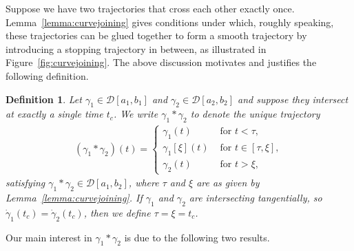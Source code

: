 \documentclass[a4paper]{article}
\theoremstyle{definition}
\theoremstyle{plain}
\newtheorem{define}{Definition\hspace{0.25em}\ignorespaces}
\begin{document}
Suppose we have two trajectories that cross each other exactly once. Lemma~\ref{lemma:curvejoining}
gives conditions under which, roughly speaking, these trajectories can be glued
together to form a smooth trajectory by introducing a stopping trajectory in
between, as illustrated in Figure~\ref{fig:curvejoining}. The above discussion motivates and
justifies the following definition.

\begin{define}
  Let $\gamma_{1} \in \mathcal{D}[a_{1}, b_{1}]$ and
  $\gamma_{2} \in \mathcal{D}[a_{2}, b_{2}]$ and suppose they intersect at
  exactly a single time $t_{c}$. We write $\gamma_{1} * \gamma_{2}$ to denote
  the unique trajectory
  \begin{align}
    (\gamma_{1} * \gamma_{2})(t) =
    \begin{cases}
      \gamma_{1}(t) & \text{ for } t < \tau , \\
      \gamma_{1}[\xi](t) & \text{ for } t \in [\tau, \xi] , \\
      \gamma_{2}(t) & \text{ for } t > \xi ,
    \end{cases}
  \end{align}
  satisfying $\gamma_{1} * \gamma_{2} \in \mathcal{D}[a_{1}, b_{2}]$, where
  $\tau$ and $\xi$ are as given by Lemma~\ref{lemma:curvejoining}.
  If $\gamma_{1}$ and $\gamma_{2}$ are intersecting tangentially, so
  $\dot{\gamma}_{1}(t_{c}) = \dot{\gamma}_{2}(t_{c})$, then we define
  $\tau=\xi=t_{c}$.
\end{define}

Our main interest in $\gamma_{1} * \gamma_{2}$ is due to the following two results.
\end{document}
